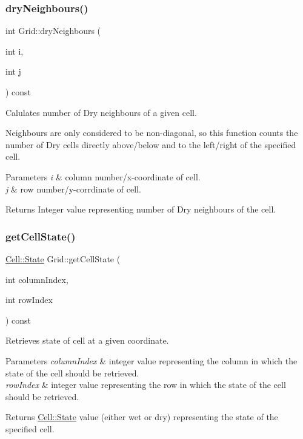 \subsubsection{\texorpdfstring{dry\+Neighbours()}{dryNeighbours()}}
{\footnotesize\ttfamily int Grid\+::dry\+Neighbours (\begin{DoxyParamCaption}\item[{int}]{i,  }\item[{int}]{j }\end{DoxyParamCaption}) const}



Calulates number of Dry neighbours of a given cell. 

Neighbours are only considered to be non-\/diagonal, so this function counts the number of Dry cells directly above/below and to the left/right of the specified cell.


\begin{DoxyParams}{Parameters}
{\em i} & column number/x-\/coordinate of cell. \\
\hline
{\em j} & row number/y-\/corrdinate of cell.\\
\hline
\end{DoxyParams}
\begin{DoxyReturn}{Returns}
Integer value representing number of Dry neighbours of the cell. 
\end{DoxyReturn}
\mbox{\label{class_grid_a425801f2747d6be34c10eb6535ab0829}} 
\subsubsection{\texorpdfstring{get\+Cell\+State()}{getCellState()}}
{\footnotesize\ttfamily \hyperlink{class_cell_a21d74a2efcb79c93e5649b06a50b7cf5}{Cell\+::\+State} Grid\+::get\+Cell\+State (\begin{DoxyParamCaption}\item[{int}]{column\+Index,  }\item[{int}]{row\+Index }\end{DoxyParamCaption}) const}



Retrieves state of cell at a given coordinate. 


\begin{DoxyParams}{Parameters}
{\em column\+Index} & integer value representing the column in which the state of the cell should be retrieved.\\
\hline
{\em row\+Index} & integer value representing the row in which the state of the cell should be retrieved.\\
\hline
\end{DoxyParams}
\begin{DoxyReturn}{Returns}
\hyperlink{class_cell_a21d74a2efcb79c93e5649b06a50b7cf5}{Cell\+::\+State} value (either wet or dry) representing the state of the specified cell. 
\end{DoxyReturn}
\mbox{\label{class_grid_aee0114021b6858483965cc1bffd7b88b}} 
